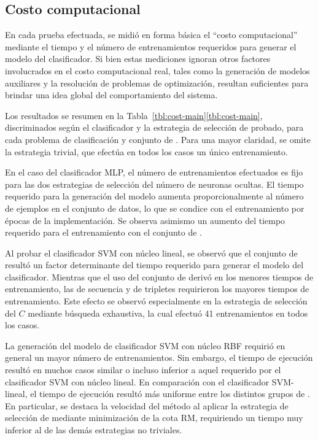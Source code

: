 %
%
\subsection{Costo computacional}
%
En cada prueba efectuada, se midió en forma básica el ``costo
computacional'' mediante el tiempo y el número de entrenamientos
requeridos para generar el modelo del clasificador.
Si bien estas mediciones ignoran otros factores involucrados en el
costo computacional real, tales como la generación de modelos
auxiliares y la resolución de problemas de optimización, resultan
suficientes para brindar una idea global del comportamiento del
sistema.

Los resultados se resumen en la
\iflatexml{}Tabla~\ref{tbl:cost-main}\else\autoref{tbl:cost-main}\fi{},
discriminados según el clasificador y la estrategia de selección de
 probado, para cada problema de clasificación y conjunto de
.
Para una mayor claridad, se omite la estrategia trivial, que efectúa
en todos los casos un único entrenamiento.

En el caso del clasificador MLP, el número de entrenamientos
efectuados es fijo para las dos estrategias de selección del número de
neuronas ocultas.
El tiempo requerido para la generación del modelo aumenta
proporcionalmente al número de ejemplos en el conjunto de datos, lo
que se condice con el entrenamiento por épocas de la implementación.
Se observa asimismo un aumento del tiempo requerido para el
entrenamiento con el conjunto de  .

Al probar el clasificador SVM con núcleo lineal, se observó que el
conjunto de  resultó un factor determinante del tiempo
requerido para generar el modelo del clasificador.
Mientras que el uso del conjunto de   derivó en los
menores tiempos de entrenamiento, las  de secuencia y de
tripletes requirieron los mayores tiempos de entrenamiento.
Este efecto se observó especialmente en la estrategia de selección del
\hparam{} $C$ mediante búsqueda exhaustiva, la cual efectuó 41
entrenamientos en todos los casos.

La generación del modelo de clasificador SVM con núcleo RBF requirió
en general un mayor número de entrenamientos.
Sin embargo, el tiempo de ejecución resultó en muchos casos similar o
incluso inferior a aquel requerido por el clasificador SVM con núcleo
lineal.
En comparación con el clasificador SVM-lineal, el tiempo de ejecución
resultó más uniforme entre los distintos grupos de .
En particular, se destaca la velocidad del método al aplicar la
estrategia de selección de  mediante minimización de la cota
RM, requiriendo un tiempo muy inferior al de las demás estrategias no
triviales.
